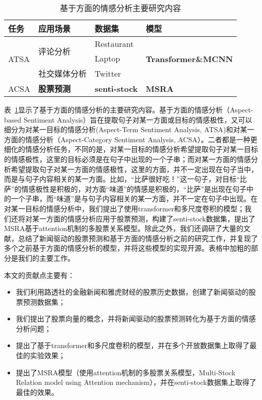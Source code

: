 \begin{table}[ht]
	\centering 
	\caption{基于方面的情感分析主要研究内容}
	\label{tab:content}
	\begin{tabular}{|l|l|l|l|}
	\hline
	任务                                               & 应用场景                  & 数据集         & 模型                                 \\ \hline
	\multirow{3}{*}{ATSA} & \multirow{2}{*}{评论分析} & Restaurant  & \multirow{3}{*}{\textbf{Transformer\&MCNN}} \\ \cline{3-3}
													 &                       & Laptop      &                                    \\ \cline{2-3}
													 & 社交媒体分析                & Twitter     &                                    \\ \hline
	ACSA               & \textbf{股票预测}                  & \textbf{senti-stock} & \textbf{MSRA}                               \\ \hline
	\end{tabular}
\end{table}

表~\ref{tab:content}显示了基于方面的情感分析的主要研究内容。基于方面的情感分析（Aspect-based Sentiment Analysis）旨在提取句子对某一方面或目标的情感极性，又可以细分为对某一目标的情感分析(Aspect-Term Sentiment Analysis, ATSA)和对某一方面的情感分析（Aspect-Category Sentiment Analysis, ACSA）。二者都是一种更细化的情感分析任务，不同的是，对某一目标的情感分析希望提取句子对某一目标的情感极性，这里的目标必须是在句子中出现的一个子串；而对某一方面的情感分析希望提取句子对某一方面的情感极性，这里的方面，并不一定出现在句子当中，而是与句子内容相关的某一方面。比如，“比萨很好吃！”这一句子，对目标“比萨”的情感极性是积极的，对方面“味道”的情感是积极的，“比萨”是出现在句子中的一个子串，而“味道”是与句子内容相关的某一方面，并不一定在句子中出现。在对某一目标的情感分析中，我们提出了使用transformer和多尺度卷积的模型；我们还将对某一方面的情感分析应用于股票预测，构建了senti-stock数据集，提出了MSRA基于attention机制的多股票关系模型。除此之外，我们还调研了大量的文献，总结了新闻驱动的股票预测和基于方面的情感分析之前的研究工作，并复现了多个之前基于方面的情感分析的模型，并将这些模型的实现开源。表格中加粗的部分是我们的主要工作。

  本文的贡献点主要有：
\begin{itemize}
	\item 我们利用路透社的金融新闻和雅虎财经的股票历史数据，创建了新闻驱动的股票预测数据集；
	\item 我们提出了股票向量的概念，并将新闻驱动的股票预测转化为基于方面的情感分析问题；
	\item 提出了基于transformer和多尺度卷积的模型，并在多个开放数据集上取得了最佳的实验效果；
	\item 提出了MSRA模型（使用attention机制的多股票关系模型，Multi-Stock Relation model using Attention mechanism），并在senti-stock数据集上取得了最佳的效果。
\end{itemize}

